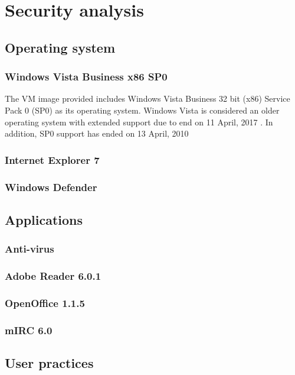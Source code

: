 \section{Security analysis}

\subsection{Operating system}

\subsubsection{Windows Vista Business x86 SP0}

The VM image provided includes Windows Vista Business 32 bit (x86) Service Pack 0 (SP0) as its operating system. Windows Vista is considered an older operating system with extended support due to end on 11 April, 2017 \citep{Microsoft2014}. In addition, SP0 support has ended on 13 April, 2010 \citep{Microsoft2015}

\subsubsection{Internet Explorer 7}

\subsubsection{Windows Defender}

\subsection{Applications}

\subsubsection{Anti-virus}

\subsubsection{Adobe Reader 6.0.1}

\subsubsection{OpenOffice 1.1.5}

\subsubsection{mIRC 6.0}

\subsection{User practices}